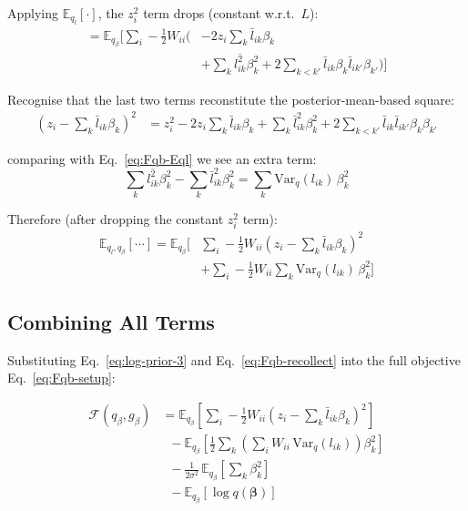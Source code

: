 \documentclass[11pt]{article}
\newcommand{\lbar}[2]{\bar{l}_{#1#2}}
\newcommand{\lsec}[2]{\overline{l^2_{#1#2}}}
\begin{document}
\begin{derivbox}
Applying $\mathbb{E}_{q_l}[\cdot]$, the $z_i^2$ term drops (constant w.r.t.\ $L$):
\begin{align}
  = \mathbb{E}_{q_\beta}\!\Biggl[\sum_i -\frac{1}{2}W_{ii}\Biggl(
    &-2z_i\sum_k \lbar{i}{k}\beta_k \nonumber\\
    &+\sum_k \lsec{i}{k}\beta_k^2
     + 2\sum_{k<k'}\lbar{i}{k}\beta_k\lbar{i}{k'}\beta_{k'}
  \Biggr)\Biggr] \label{eq:Fqb-Eql}
\end{align}

Recognise that the last two terms reconstitute the posterior-mean-based square:
\begin{align}
  \left(z_i - \sum_k \lbar{i}{k}\beta_k\right)^2
  &= z_i^2 - 2z_i\sum_k\lbar{i}{k}\beta_k
    + \sum_k\lbar{i}{k}^2\beta_k^2
    + 2\sum_{k<k'}\lbar{i}{k}\lbar{i}{k'}\beta_k\beta_{k'}
  \label{eq:verify-square}
\end{align}

comparing with Eq.~\eqref{eq:Fqb-Eql} we see an extra term:
\begin{equation}
  \sum_k\lsec{i}{k}\beta_k^2 - \sum_k\lbar{i}{k}^2\beta_k^2
  = \sum_k\mathrm{Var}_q(l_{ik})\,\beta_k^2
\end{equation}

Therefore (after dropping the constant $z_i^2$ term):
\begin{align}
  \mathbb{E}_{q_l,q_\beta}\!\left[\cdots\right]
  = \mathbb{E}_{q_\beta}\!\Biggl[
    &\sum_i -\frac{1}{2}W_{ii}\left(z_i - \sum_k\lbar{i}{k}\beta_k\right)^2 \nonumber\\
    &+ \sum_i -\frac{1}{2}W_{ii}\sum_k\mathrm{Var}_q(l_{ik})\,\beta_k^2
  \Biggr] \label{eq:Fqb-recollect}
\end{align}
\end{derivbox}

\subsection{Combining All Terms}

Substituting Eq.~\eqref{eq:log-prior-3} and Eq.~\eqref{eq:Fqb-recollect}
into the full objective Eq.~\eqref{eq:Fqb-setup}:

\begin{align}
  \mathcal{F}(q_\beta, g_\beta)
  &= \mathbb{E}_{q_\beta}\!\left[\sum_i -\frac{1}{2}W_{ii}
     \left(z_i - \sum_k\lbar{i}{k}\beta_k\right)^2\right]
  \label{eq:Fqb-term1}\\
  &\;\;- \mathbb{E}_{q_\beta}\!\left[
     \frac{1}{2}\sum_k\left(\sum_i W_{ii}\,\mathrm{Var}_q(l_{ik})\right)\beta_k^2
  \right]
  \label{eq:Fqb-term2}\\
  &\;\;- \frac{1}{2\sigma^2}\,\mathbb{E}_{q_\beta}\!\left[\sum_k\beta_k^2\right]
  \label{eq:Fqb-term3}\\
  &\;\;- \mathbb{E}_{q_\beta}\!\left[\log q(\bm{\beta})\right]
  \label{eq:Fqb-term4}
\end{align}
\end{document}
